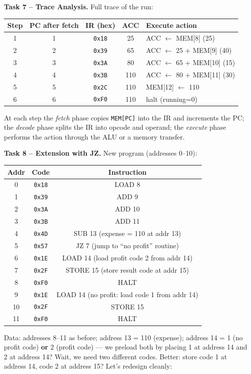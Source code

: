 \documentclass[11pt]{article}
\begin{document}
\textbf{Task 7 -- Trace Analysis.}
Full trace of the run:

\begin{center}
\begin{tabular}{|c|c|c|c|l|}
\hline
\rowcolor{popblueL} \textbf{Step} & \textbf{PC after fetch} & \textbf{IR (hex)} & \textbf{ACC} & \textbf{Execute action} \\
\hline
1 & 1 & \texttt{0x18} & 25 & ACC $\leftarrow$ MEM[8] (25) \\
2 & 2 & \texttt{0x39} & 65 & ACC $\leftarrow$ 25 $+$ MEM[9] (40) \\
3 & 3 & \texttt{0x3A} & 80 & ACC $\leftarrow$ 65 $+$ MEM[10] (15) \\
4 & 4 & \texttt{0x3B} & 110 & ACC $\leftarrow$ 80 $+$ MEM[11] (30) \\
5 & 5 & \texttt{0x2C} & 110 & MEM[12] $\leftarrow$ 110 \\
6 & 6 & \texttt{0xF0} & 110 & halt (running=0) \\
\hline
\end{tabular}
\end{center}
At each step the \emph{fetch} phase copies \texttt{MEM[PC]} into the IR and increments the PC; the \emph{decode} phase splits the IR into opcode and operand; the \emph{execute} phase performs the action through the ALU or a memory transfer.

\textbf{Task 8 -- Extension with JZ.}
New program (addresses 0--10):
\begin{center}
\begin{tabular}{|c|c|c|}
\hline
\rowcolor{popblueL} \textbf{Addr} & \textbf{Code} & \textbf{Instruction} \\
\hline
0 & \texttt{0x18} & LOAD 8 \\
1 & \texttt{0x39} & ADD 9 \\
2 & \texttt{0x3A} & ADD 10 \\
3 & \texttt{0x3B} & ADD 11 \\
4 & \texttt{0x4D} & SUB 13 \quad (expense = 110 at addr 13) \\
5 & \texttt{0x57} & JZ 7 \quad (jump to ``no profit'' routine) \\
6 & \texttt{0x1E} & LOAD 14 \quad (load profit code 2 from addr 14) \\
7 & \texttt{0x2F} & STORE 15 \quad (store result code at addr 15) \\
8 & \texttt{0xF0} & HALT \\
9 & \texttt{0x1E} & LOAD 14 \quad (no profit: load code 1 from addr 14) \\
10 & \texttt{0x2F} & STORE 15 \\
11 & \texttt{0xF0} & HALT \\
\hline
\end{tabular}
\end{center}
Data: addresses 8--11 as before; address 13 = 110 (expense); address 14 = 1 (no profit code) \textbf{or} 2 (profit code) — we preload both by placing 1 at address 14 and 2 at address 14? Wait, we need two different codes. Better: store code 1 at address 14, code 2 at address 15? Let's redesign cleanly:
\end{document}
